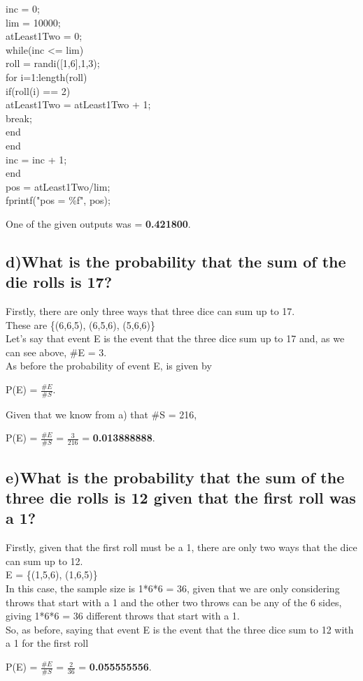 \documentclass{report}
\begin{document}
			inc = 0;\\
			lim = 10000;\\
			atLeast1Two = 0;\\
			while(inc <= lim)\\
			\indent roll = randi([1,6],1,3);\\
			\indent for i=1:length(roll)\\
			\indent \indent if(roll(i) == 2)\\
			\indent \indent \indent atLeast1Two = atLeast1Two + 1;\\
			\indent \indent \indent break;\\
			\indent \indent end\\
			\indent end\\
			\indent inc = inc + 1;\\
			end\\
			pos = atLeast1Two/lim;\\
			fprintf("pos = \%f", pos);
			\begin{center}
				One of the given outputs was = \textbf{0.421800}.
			\end{center}
			
		
		\subsection*{d)What is the probability that the sum of the die rolls is 17?}
		Firstly, there are only three ways that three dice can sum up to 17.\\
		These are \{(6,6,5), (6,5,6), (5,6,6)\}\\
		Let's say that event E is the event that the three dice sum up to 17 and, as we can see above, \#E = 3.\\
		As before the probability of event E, is given by
		\begin{center}
			P(E) = $\frac{\#E}{\#S}$.
		\end{center}
		Given that we know from a) that \#S = 216,
		\begin{center}
			P(E) = $\frac{\#E}{\#S}$ = $\frac{3}{216}$ = \textbf{0.013888888}.
		\end{center}
	
	
		\subsection*{e)What is the probability that the sum of the three die rolls is 12 given that the first roll was a 1?}
		Firstly, given that the first roll must be a 1, there are only two ways that the dice can sum up to 12.\\
		E = \{(1,5,6), (1,6,5)\}\\
		In this case, the sample size is 1*6*6 = 36, given that we are only considering throws that start with a 1 and the other two throws can be any of the 6 sides, giving 1*6*6 = 36 different throws that start with a 1.\\
		So, as before, saying that event E is the event that the three dice sum to 12 with a 1 for the first roll
		\begin{center}
			P(E) = $\frac{\#E}{\#S}$ = $\frac{2}{36}$ = \textbf{0.055555556}.
		\end{center}
	
\end{document}
